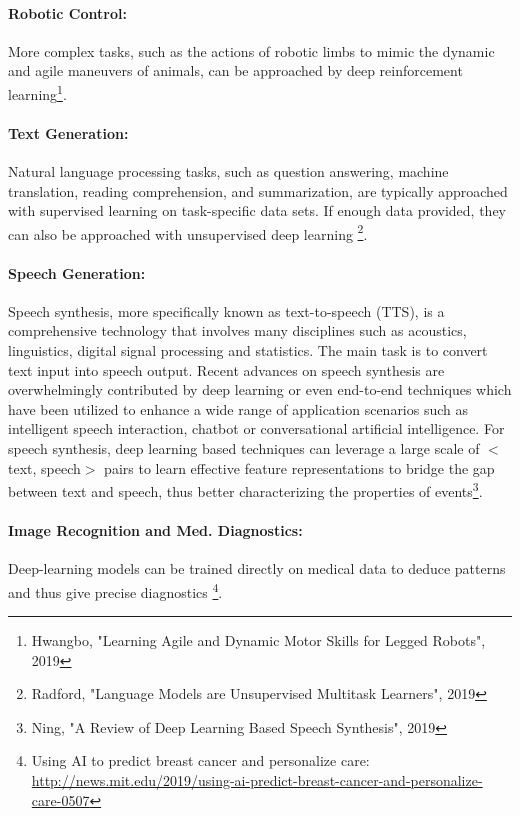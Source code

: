 \documentclass[main]{subfiles}
\begin{document}
\paragraph{Robotic Control:}
More complex tasks, such as the actions of robotic limbs to mimic the dynamic and agile maneuvers of animals, can be approached by deep reinforcement learning\footnote{Hwangbo, "Learning Agile and Dynamic Motor Skills for Legged Robots", 2019}. 

\paragraph{Text Generation:}
Natural language processing tasks, such as question answering, machine translation, reading comprehension, and summarization, are typically approached with supervised learning on task-specific data sets. If enough data provided, they can also be approached with unsupervised deep learning \footnote{Radford, "Language Models are Unsupervised Multitask Learners", 2019}.

\paragraph{Speech Generation:}
Speech synthesis, more specifically known as text-to-speech (TTS), is a comprehensive technology that involves many disciplines such as acoustics, linguistics, digital signal processing and statistics. The main task is to convert text input into speech output.  Recent advances on speech synthesis are overwhelmingly contributed by deep learning or even end-to-end techniques which have been utilized to enhance a wide range of application scenarios such as intelligent speech interaction, chatbot or conversational artificial intelligence. For speech synthesis, deep learning based techniques can leverage a large scale of $<$text, speech$>$ pairs to learn effective feature representations to bridge the gap between text and speech, thus better characterizing the properties of events\footnote{Ning, "A Review of Deep Learning Based Speech Synthesis", 2019}.

\paragraph{Image Recognition and Med. Diagnostics:}
Deep-learning models can be trained directly on medical data to deduce patterns and thus give precise diagnostics \footnote{Using AI to predict breast cancer and personalize care: \url{http://news.mit.edu/2019/using-ai-predict-breast-cancer-and-personalize-care-0507}}.
\end{document}
